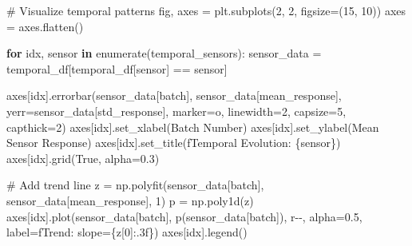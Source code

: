 \documentclass[
  letterpaper,
  DIV=11,
  numbers=noendperiod]{scrartcl}
\newenvironment{Shaded}{\begin{snugshade}}{\end{snugshade}}
\newcommand{\BuiltInTok}[1]{\textcolor[rgb]{0.00,0.23,0.31}{#1}}
\newcommand{\CommentTok}[1]{\textcolor[rgb]{0.37,0.37,0.37}{#1}}
\newcommand{\ControlFlowTok}[1]{\textcolor[rgb]{0.00,0.23,0.31}{\textbf{#1}}}
\newcommand{\DecValTok}[1]{\textcolor[rgb]{0.68,0.00,0.00}{#1}}
\newcommand{\FloatTok}[1]{\textcolor[rgb]{0.68,0.00,0.00}{#1}}
\newcommand{\KeywordTok}[1]{\textcolor[rgb]{0.00,0.23,0.31}{\textbf{#1}}}
\newcommand{\NormalTok}[1]{\textcolor[rgb]{0.00,0.23,0.31}{#1}}
\newcommand{\OperatorTok}[1]{\textcolor[rgb]{0.37,0.37,0.37}{#1}}
\newcommand{\SpecialCharTok}[1]{\textcolor[rgb]{0.37,0.37,0.37}{#1}}
\newcommand{\SpecialStringTok}[1]{\textcolor[rgb]{0.13,0.47,0.30}{#1}}
\newcommand{\StringTok}[1]{\textcolor[rgb]{0.13,0.47,0.30}{#1}}
\newcommand{\VariableTok}[1]{\textcolor[rgb]{0.07,0.07,0.07}{#1}}
\renewenvironment{Shaded}{%
  \begin{tcolorbox}[%
    enhanced,%
    colback=codebg,%
    colframe=codebg,%
    borderline west={3pt}{0pt}{sectionblue},%
    fontupper=\small\ttfamily,%
    boxrule=0pt,%
    arc=0pt,%
    boxsep=5pt,%
    left=2mm,%
    right=2mm,%
    top=2mm,%
    bottom=2mm%
  ]%
}{%
  \end{tcolorbox}%
}
\begin{document}
\begin{Shaded}
\begin{Highlighting}[]
\CommentTok{\# Visualize temporal patterns}
\NormalTok{fig, axes }\OperatorTok{=}\NormalTok{ plt.subplots(}\DecValTok{2}\NormalTok{, }\DecValTok{2}\NormalTok{, figsize}\OperatorTok{=}\NormalTok{(}\DecValTok{15}\NormalTok{, }\DecValTok{10}\NormalTok{))}
\NormalTok{axes }\OperatorTok{=}\NormalTok{ axes.flatten()}

\ControlFlowTok{for}\NormalTok{ idx, sensor }\KeywordTok{in} \BuiltInTok{enumerate}\NormalTok{(temporal\_sensors):}
\NormalTok{    sensor\_data }\OperatorTok{=}\NormalTok{ temporal\_df[temporal\_df[}\StringTok{\textquotesingle{}sensor\textquotesingle{}}\NormalTok{] }\OperatorTok{==}\NormalTok{ sensor]}
    
\NormalTok{    axes[idx].errorbar(sensor\_data[}\StringTok{\textquotesingle{}batch\textquotesingle{}}\NormalTok{], sensor\_data[}\StringTok{\textquotesingle{}mean\_response\textquotesingle{}}\NormalTok{],}
\NormalTok{                       yerr}\OperatorTok{=}\NormalTok{sensor\_data[}\StringTok{\textquotesingle{}std\_response\textquotesingle{}}\NormalTok{], }
\NormalTok{                       marker}\OperatorTok{=}\StringTok{\textquotesingle{}o\textquotesingle{}}\NormalTok{, linewidth}\OperatorTok{=}\DecValTok{2}\NormalTok{, capsize}\OperatorTok{=}\DecValTok{5}\NormalTok{, capthick}\OperatorTok{=}\DecValTok{2}\NormalTok{)}
\NormalTok{    axes[idx].set\_xlabel(}\StringTok{\textquotesingle{}Batch Number\textquotesingle{}}\NormalTok{)}
\NormalTok{    axes[idx].set\_ylabel(}\StringTok{\textquotesingle{}Mean Sensor Response\textquotesingle{}}\NormalTok{)}
\NormalTok{    axes[idx].set\_title(}\SpecialStringTok{f\textquotesingle{}Temporal Evolution: }\SpecialCharTok{\{}\NormalTok{sensor}\SpecialCharTok{\}}\SpecialStringTok{\textquotesingle{}}\NormalTok{)}
\NormalTok{    axes[idx].grid(}\VariableTok{True}\NormalTok{, alpha}\OperatorTok{=}\FloatTok{0.3}\NormalTok{)}
    
    \CommentTok{\# Add trend line}
\NormalTok{    z }\OperatorTok{=}\NormalTok{ np.polyfit(sensor\_data[}\StringTok{\textquotesingle{}batch\textquotesingle{}}\NormalTok{], sensor\_data[}\StringTok{\textquotesingle{}mean\_response\textquotesingle{}}\NormalTok{], }\DecValTok{1}\NormalTok{)}
\NormalTok{    p }\OperatorTok{=}\NormalTok{ np.poly1d(z)}
\NormalTok{    axes[idx].plot(sensor\_data[}\StringTok{\textquotesingle{}batch\textquotesingle{}}\NormalTok{], p(sensor\_data[}\StringTok{\textquotesingle{}batch\textquotesingle{}}\NormalTok{]), }
                  \StringTok{\textquotesingle{}r{-}{-}\textquotesingle{}}\NormalTok{, alpha}\OperatorTok{=}\FloatTok{0.5}\NormalTok{, label}\OperatorTok{=}\SpecialStringTok{f\textquotesingle{}Trend: slope=}\SpecialCharTok{\{}\NormalTok{z[}\DecValTok{0}\NormalTok{]}\SpecialCharTok{:.3f\}}\SpecialStringTok{\textquotesingle{}}\NormalTok{)}
\NormalTok{    axes[idx].legend()}


\end{Highlighting}
\end{Shaded}
\end{document}
